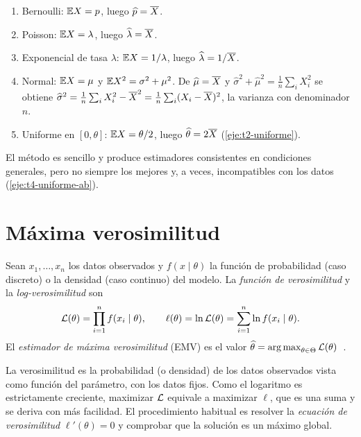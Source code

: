 \begin{ejemplo}\label{ej:t4-momentos}
\leavevmode
\begin{enumerate}
  \item Bernoulli: $\mathbb{E} X=p$, luego $\widehat p=\overline{X}$.
  \item Poisson: $\mathbb{E} X=\lambda$, luego $\widehat\lambda=\overline{X}$.
  \item Exponencial de tasa $\lambda$: $\mathbb{E} X=1/\lambda$, luego $\widehat\lambda=1/\overline{X}$.
  \item Normal: $\mathbb{E} X=\mu$ y $\mathbb{E} X^{2}=\sigma^{2}+\mu^{2}$. De $\widehat\mu=\overline{X}$ y $\widehat\sigma^{2}+\widehat\mu^{2}=\frac1n\sum_iX_i^{2}$ se obtiene $\widehat\sigma^{2}=\frac1n\sum_iX_i^{2}-\overline{X}^{2}=\frac1n\sum_i(X_i-\overline{X})^{2}$, la varianza con denominador $n$.
  \item Uniforme en $[0,\theta]$: $\mathbb{E} X=\theta/2$, luego $\widehat\theta=2\overline{X}$ (\cref{eje:t2-uniforme}).
\end{enumerate}
\end{ejemplo}

El método es sencillo y produce estimadores consistentes en condiciones generales, pero no siempre los mejores y, a veces, incompatibles con los datos (\cref{eje:t4-uniforme-ab}).

\section{Máxima verosimilitud}

\begin{definicion}\label{def:t4-emv}
Sean $x_1,\dots,x_n$ los datos observados y $f(x\mid\theta)$ la función de probabilidad (caso discreto) o la densidad (caso continuo) del modelo. La \emph{función de verosimilitud} y la \emph{log-verosimilitud} son
\[
\mathcal{L}(\theta)=\prod_{i=1}^{n}f(x_i\mid\theta),\qquad \ell(\theta)=\ln\mathcal{L}(\theta)=\sum_{i=1}^{n}\ln f(x_i\mid\theta).
\]
El \emph{estimador de máxima verosimilitud} (EMV) es el valor $\widehat\theta=\operatorname*{arg\,max}_{\theta\in\Theta}\mathcal{L}(\theta)$~\cite[cap.~9]{wasserman}.
\end{definicion}

La verosimilitud es la probabilidad (o densidad) de los datos observados vista como función del parámetro, con los datos fijos. Como el logaritmo es estrictamente creciente, maximizar $\mathcal{L}$ equivale a maximizar $\ell$, que es una suma y se deriva con más facilidad. El procedimiento habitual es resolver la \emph{ecuación de verosimilitud} $\ell'(\theta)=0$ y comprobar que la solución es un máximo global.

